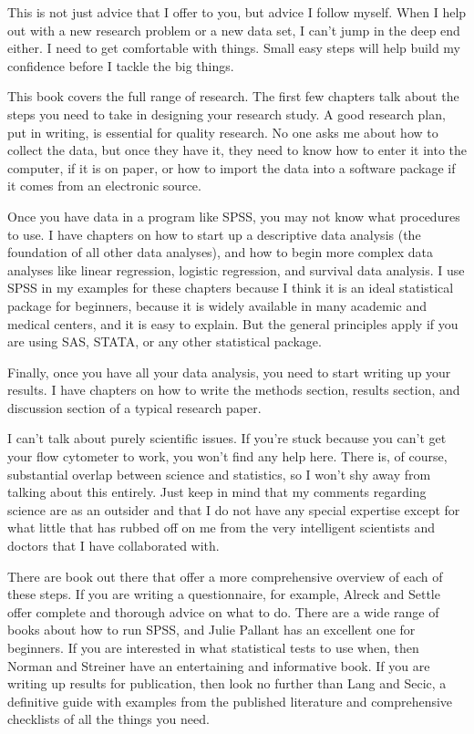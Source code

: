 \documentclass[
  letterpaper,
  DIV=11,
  numbers=noendperiod]{scrreprt}
\begin{document}
This is not just advice that I offer to you, but advice I follow myself.
When I help out with a new research problem or a new data set, I can't
jump in the deep end either. I need to get comfortable with things.
Small easy steps will help build my confidence before I tackle the big
things.

This book covers the full range of research. The first few chapters talk
about the steps you need to take in designing your research study. A
good research plan, put in writing, is essential for quality research.
No one asks me about how to collect the data, but once they have it,
they need to know how to enter it into the computer, if it is on paper,
or how to import the data into a software package if it comes from an
electronic source.

Once you have data in a program like SPSS, you may not know what
procedures to use. I have chapters on how to start up a descriptive data
analysis (the foundation of all other data analyses), and how to begin
more complex data analyses like linear regression, logistic regression,
and survival data analysis. I use SPSS in my examples for these chapters
because I think it is an ideal statistical package for beginners,
because it is widely available in many academic and medical centers, and
it is easy to explain. But the general principles apply if you are using
SAS, STATA, or any other statistical package.

Finally, once you have all your data analysis, you need to start writing
up your results. I have chapters on how to write the methods section,
results section, and discussion section of a typical research paper.

I can't talk about purely scientific issues. If you're stuck because you
can't get your flow cytometer to work, you won't find any help here.
There is, of course, substantial overlap between science and statistics,
so I won't shy away from talking about this entirely. Just keep in mind
that my comments regarding science are as an outsider and that I do not
have any special expertise except for what little that has rubbed off on
me from the very intelligent scientists and doctors that I have
collaborated with.

There are book out there that offer a more comprehensive overview of
each of these steps. If you are writing a questionnaire, for example,
Alreck and Settle offer complete and thorough advice on what to do.
There are a wide range of books about how to run SPSS, and Julie Pallant
has an excellent one for beginners. If you are interested in what
statistical tests to use when, then Norman and Streiner have an
entertaining and informative book. If you are writing up results for
publication, then look no further than Lang and Secic, a definitive
guide with examples from the published literature and comprehensive
checklists of all the things you need.
\end{document}
